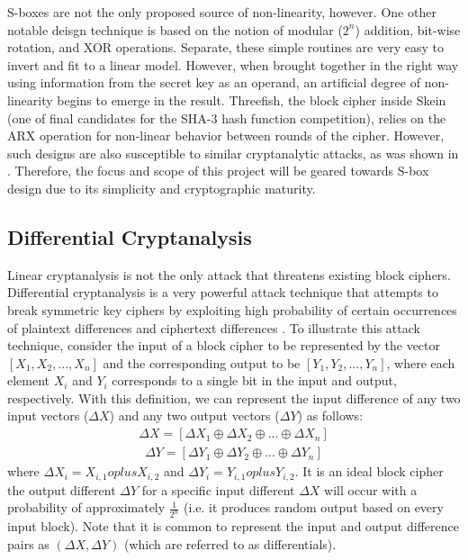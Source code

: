 \documentclass[11pt]{article}
\begin{document}
S-boxes are not the only proposed source of non-linearity, however. One other notable deisgn technique is based on the notion of modular ($2^n$) addition, bit-wise rotation, and XOR operations. Separate, these simple routines are very easy to invert and fit to a linear model. However, when brought together in the right way using information from the secret key as an operand, an artificial degree of non-linearity begins to emerge in the result. Threefish, the block cipher inside Skein (one of final candidates for the SHA-3 hash function competition), relies on the ARX operation for non-linear behavior between rounds of the cipher. However, such designs are also susceptible to similar cryptanalytic attacks, as was shown in \cite{Khovratovich:2010:RCA:1876089.1876116}. Therefore, the focus and scope of this project will be geared towards S-box design due to its simplicity and cryptographic maturity.

\subsection{Differential Cryptanalysis}
Linear cryptanalysis is not the only attack that threatens existing block ciphers. Differential cryptanalysis is a very powerful attack technique that attempts to break symmetric key ciphers by exploiting high probability of certain occurrences of plaintext differences and ciphertext differences \cite{Heys01atutorial}. To illustrate this attack technique, consider the input of a block cipher to be represented by the vector $[X_1, X_2,..., X_n]$ and the corresponding output to be $[Y_1, Y_2, ..., Y_n]$, where each element $X_i$ and $Y_i$ corresponds to a single bit in the input and output, respectively. With this definition, we can represent the input difference of any two input vectors ($\Delta X$) and any two output vectors ($\Delta Y$) as follows:
\begin{eqnarray*}
\Delta X = [\Delta X_1 \oplus \Delta X_2 \oplus ... \oplus \Delta X_n]
\end{eqnarray*}
\begin{eqnarray*}
\Delta Y= [\Delta Y_1 \oplus \Delta Y_2 \oplus ... \oplus \Delta Y_n]
\end{eqnarray*}
where $\Delta X_i = X_{i,1} oplus X_{i,2}$ and $\Delta Y_i = Y_{i,1} oplus Y_{i,2}$. It is an ideal block cipher the output different $\Delta Y$ for a specific input different $\Delta X$ will occur with a probability of approximately $\frac{1}{2^n}$ (i.e. it produces random output based on every input block). Note that it is common to represent the input and output difference pairs as $(\Delta X, \Delta Y)$ (which are referred to as differentials).
\end{document}
